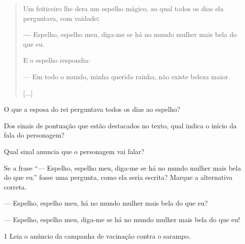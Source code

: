 \begin{quote}
Um feiticeiro lhe dera um espelho mágico, ao qual todos os dias ela
perguntava, com vaidade\textbf{:}

\textbf{---} Espelho, espelho meu, diga-me se há no mundo mulher mais bela do que
eu.

E o espelho respondia:

--- Em todo o mundo, minha querida rainha, não existe beleza maior.

{[}...{]}

\end{quote}

\begin{escolha}
\item
  O que a esposa do rei perguntava todos os dias ao espelho?



\item
  Dos sinais de pontuação que estão destacados no texto, qual indica o
  início da fala do personagem?


\item
  Qual sinal anuncia que o personagem vai falar?


\item Se a frase ``--- Espelho, espelho meu, diga-me se há no mundo mulher
mais bela do que eu.'' fosse uma pergunta, como ela seria escrita?
Marque a alternativa correta.

\begin{boxlist}
 --- Espelho, espelho meu, há no mundo mulher mais bela do que eu?

 --- Espelho, espelho meu, diga-me se há no mundo mulher mais bela do que eu!
\end{boxlist}
\end{escolha}


\num{1} Leia o anúncio da campanha de vacinação contra o sarampo.


